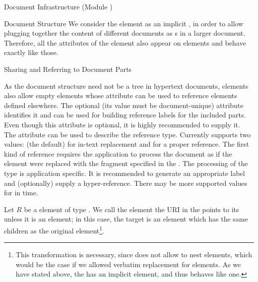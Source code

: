\begin{tchapter}[id=omdoc-infrastructure,short=Document Infrastructure]{Document Infrastructure (Module {})}
\begin{tsection}[id=sectioning]{Document Structure}
We consider the {} element as an implicit {}, in order to
allow plugging together the content of different {\omdoc} documents as
{s} in a larger document. Therefore, all the attributes of the
{} element also appear on {} elements and behave exactly
like those.
\end{tsection}

\begin{tsection}[id=sharing,short=Sharing Document Parts]{Sharing and Referring to Document Parts}
  
  As the document structure need not be a tree in hypertext documents, {}
  elements also allow empty {} elements whose {} attribute
  can be used to reference {\omdoc} elements defined elsewhere. The optional
  {} (its value must be document-unique) attribute identifies it
  and can be used for building reference labels for the included parts. Even though this
  attribute is optional, it is highly recommended to supply it.  The
  {} attribute can be used to describe the reference type.  Currently
  {\omdoc} supports two values: {} (the default) for in-text
  replacement and {} for a proper reference. The first kind of
  reference requires the {\omdoc} application to process the document as if the
  {} element were replaced with the {\omdoc} fragment specified in the
  {}. The processing of the type {} is
  application specific. It is recommended to generate an appropriate label and
  (optionally) supply a hyper-reference.  There may be more supported values for
  {} in time.

  Let $R$ be a {} element of type {}.  We call the
  element the URI in the {} points to its
  {} unless it is an
  {} element; in this case, the target is an {} element
  which has the same children as the original {} element\footnote{This
    transformation is necessary, since {\omdoc} does not allow to nest {}
    elements, which would be the case if we allowed verbatim replacement for
    {} elements. As we have stated above, the {} has an
    implicit {} element, and thus behaves like one.}.


\end{tsection}
\end{tchapter}
